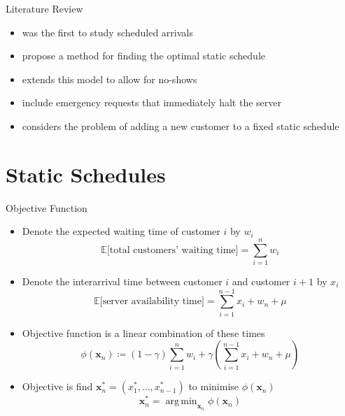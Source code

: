 \documentclass{beamer}
\DeclareMathOperator*{\argmin}{arg\,min}
\begin{document}
\begin{frame}{Literature Review}
	\begin{itemize}
		\item \citet{Bailey} was the first to study scheduled arrivals
		\item \citet{Pegden} propose a method for finding the optimal static schedule
		\item \citet{Mendel} extends this model to allow for no-shows
		\item \citet{Fiems} include emergency requests that immediately halt the server
		\item \citet{Wang} considers the problem of adding a new customer to a fixed static schedule
	\end{itemize}
\end{frame}

\section{Static Schedules}

\begin{frame}{Objective Function}
	\begin{itemize}
		\item Denote the expected waiting time of customer $i$ by $w_{i}$
		\begin{equation*}
			\mathbb{E} \Big[ \text{total customers' waiting time} \Big] = \sum_{i = 1}^{n} w_{i}
		\end{equation*}
		\item Denote the interarrival time between customer $i$ and customer $i + 1$ by $x_{i}$
		\begin{equation*}
			\mathbb{E} \Big[ \text{server availability time} \Big] = \sum_{i = 1}^{n - 1} x_{i} + w_{n} + \mu
		\end{equation*}
		\item \alert{Objective function} is a linear combination of these times
		\begin{equation*}
			\phi (\mathbf{x}_{n}) \coloneqq (1 - \gamma) \sum_{i = 1}^{n} w_{i} + \gamma \left( \sum_{i = 1}^{n - 1} x_{i} + w_{n} + \mu \right)
		\end{equation*}
		\item Objective is find $\mathbf{x}_{n}^{*} = (x_{1}^{*}, \ldots, x_{n - 1}^{*})$ to minimise $\phi (\mathbf{x}_{n})$
		\begin{equation*}
			\mathbf{x}_{n}^{*} = \argmin_{\mathbf{x}_{n}} \phi (\mathbf{x}_{n})
		\end{equation*}
	\end{itemize}
\end{frame}
\end{document}
